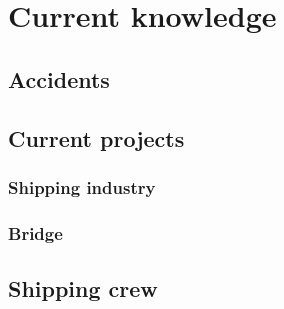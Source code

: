 \chapter{Current knowledge}

\section{Accidents}

\section{Current projects}
\subsection{Shipping industry}
\subsection{Bridge}

\section{Shipping crew}